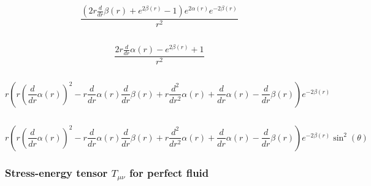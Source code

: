 \documentclass[11pt]{article}
\begin{document}
    \begin{Verbatim}[commandchars=\\\{\}]

    \end{Verbatim}

    $$\frac{\left(2 r \frac{d}{d r} \beta{\left(r \right)} + e^{2 \beta{\left(r \right)}} - 1\right) e^{2 \alpha{\left(r \right)}} e^{- 2 \beta{\left(r \right)}}}{r^{2}}$$

    
    \begin{Verbatim}[commandchars=\\\{\}]

    \end{Verbatim}

    $$\frac{2 r \frac{d}{d r} \alpha{\left(r \right)} - e^{2 \beta{\left(r \right)}} + 1}{r^{2}}$$

    
    \begin{Verbatim}[commandchars=\\\{\}]

    \end{Verbatim}

    $$r \left(r \left(\frac{d}{d r} \alpha{\left(r \right)}\right)^{2} - r \frac{d}{d r} \alpha{\left(r \right)} \frac{d}{d r} \beta{\left(r \right)} + r \frac{d^{2}}{d r^{2}} \alpha{\left(r \right)} + \frac{d}{d r} \alpha{\left(r \right)} - \frac{d}{d r} \beta{\left(r \right)}\right) e^{- 2 \beta{\left(r \right)}}$$

    
    \begin{Verbatim}[commandchars=\\\{\}]

    \end{Verbatim}

    $$r \left(r \left(\frac{d}{d r} \alpha{\left(r \right)}\right)^{2} - r \frac{d}{d r} \alpha{\left(r \right)} \frac{d}{d r} \beta{\left(r \right)} + r \frac{d^{2}}{d r^{2}} \alpha{\left(r \right)} + \frac{d}{d r} \alpha{\left(r \right)} - \frac{d}{d r} \beta{\left(r \right)}\right) e^{- 2 \beta{\left(r \right)}} \sin^{2}{\left(\theta \right)}$$

    
    \hypertarget{stress-energy-tensor-t_mu-nu-for-perfect-fluid}{%
\subsubsection{\texorpdfstring{Stress-energy tensor \(T_{\mu \nu}\) for
perfect
fluid}{Stress-energy tensor T\_\{\textbackslash{}mu \textbackslash{}nu\} for perfect fluid}}\label{stress-energy-tensor-t_mu-nu-for-perfect-fluid}}
\end{document}
